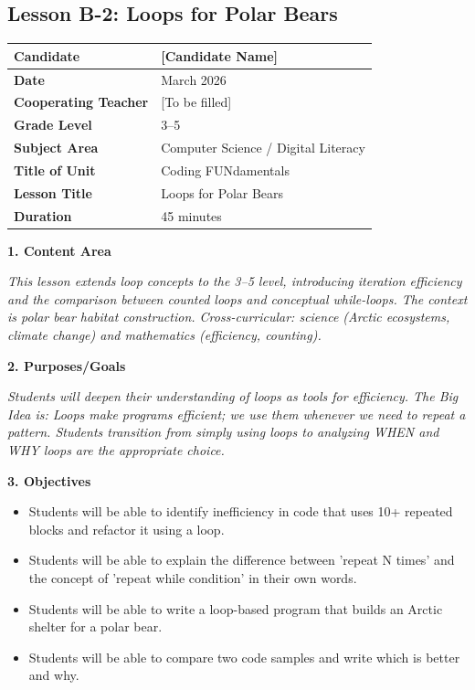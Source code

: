 \documentclass[11pt,letterpaper]{article}
\begin{document}
\newpage
\subsection{Lesson B-2: Loops for Polar Bears}
\label{sub:LessonB2LoopsforPolarBears}

\begin{longtable}{|L{0.28\textwidth}|L{0.65\textwidth}|}
\hline
\textbf{Candidate}  & [Candidate Name]  \\
\hline
\textbf{Date}  & March 2026  \\
\hline
\textbf{Cooperating Teacher}  & [To be filled]  \\
\hline
\textbf{Grade Level}  & 3--5  \\
\hline
\textbf{Subject Area}  & Computer Science / Digital Literacy  \\
\hline
\textbf{Title of Unit}  & Coding FUNdamentals  \\
\hline
\textbf{Lesson Title}  & Loops for Polar Bears  \\
\hline
\textbf{Duration}  & 45 minutes  \\
\hline
\end{longtable}

\textbf{1. Content Area}

\textit{This lesson extends loop concepts to the 3--5 level, introducing iteration efficiency and the comparison between counted loops and conceptual while-loops. The context is polar bear habitat construction. Cross-curricular: science (Arctic ecosystems, climate change) and mathematics (efficiency, counting).}

\textbf{2. Purposes/Goals}

\textit{Students will deepen their understanding of loops as tools for efficiency. The Big Idea is: Loops make programs efficient; we use them whenever we need to repeat a pattern. Students transition from simply using loops to analyzing WHEN and WHY loops are the appropriate choice.}

\textbf{3. Objectives}

\begin{itemize}
  \item Students will be able to identify inefficiency in code that uses 10+ repeated blocks and refactor it using a loop.

  \item Students will be able to explain the difference between 'repeat N times' and the concept of 'repeat while condition' in their own words.

  \item Students will be able to write a loop-based program that builds an Arctic shelter for a polar bear.

  \item Students will be able to compare two code samples and write which is better and why.
\end{itemize}
\end{document}
